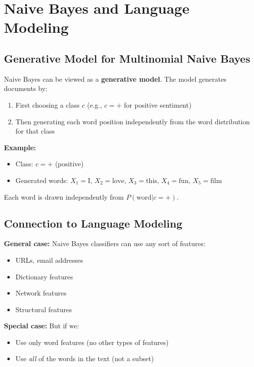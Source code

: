 \documentclass[11pt,a4paper]{article}
\theoremstyle{definition}
\theoremstyle{plain}
\theoremstyle{remark}
\begin{document}
\section{Naive Bayes and Language Modeling}

\subsection{Generative Model for Multinomial Naive Bayes}

Naive Bayes can be viewed as a \textbf{generative model}. The model generates documents by:

\begin{enumerate}
    \item First choosing a class $c$ (e.g., $c = +$ for positive sentiment)
    \item Then generating each word position independently from the word distribution for that class
\end{enumerate}

\textbf{Example:}
\begin{itemize}
    \item Class: $c = +$ (positive)
    \item Generated words: $X_1 = \text{I}$, $X_2 = \text{love}$, $X_3 = \text{this}$, $X_4 = \text{fun}$, $X_5 = \text{film}$
\end{itemize}

Each word is drawn independently from $P(\text{word} | c = +)$.

\subsection{Connection to Language Modeling}

\textbf{General case:}
Naive Bayes classifiers can use any sort of features:
\begin{itemize}
    \item URLs, email addresses
    \item Dictionary features
    \item Network features
    \item Structural features
\end{itemize}

\textbf{Special case:}
But if we:
\begin{itemize}
    \item Use only word features (no other types of features)
    \item Use \textit{all} of the words in the text (not a subset)
\end{itemize}
\end{document}
